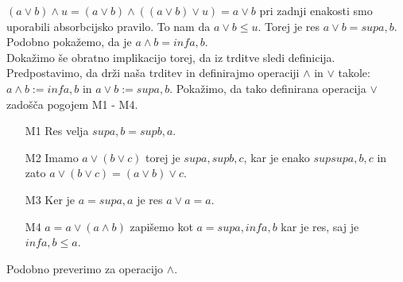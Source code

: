  $ \left(a \vee b\right) \wedge u = \left(a \vee b\right) \wedge \left( \left(a \vee b\right) \vee u\right) = 
 a \vee b$ pri zadnji enakosti smo uporabili absorbcijsko pravilo. To nam da $ a \vee b \leq u$. Torej je res 
 $a \vee b = sup{a, b}$. Podobno pokažemo, da je $a \wedge b = inf{a, b}$.\\
 Dokažimo še obratno implikacijo torej, da iz trditve sledi definicija. Predpostavimo, da drži naša trditev in 
 definirajmo operaciji $\wedge$ in $\vee$ takole: $a \wedge b := inf{a, b}$ in $a \vee b := sup{a, b}$.
 Pokažimo, da tako definirana operacija $\vee$ zadošča pogojem M1 - M4.
 \begin{enumerate}
    \item[M1] Res velja $sup{a, b} = sup{b, a}$.
    \item[M2] Imamo $a \vee \left(b \vee c\right)$ torej je $sup{a, sup{b, c}}$, kar je enako $sup{sup{a,b}, c}$ in zato 
    $a \vee \left(b \vee c\right) = \left(a \vee b\right) \vee c$. 
    \item[M3] Ker je $a = sup{a, a}$ je res $a \vee a = a$. 
    \item[M4] $a = a \vee \left(a \wedge b\right)$ zapišemo kot $a = sup {a, inf{a, b}}$ kar je res, saj je $inf{a, b} 
    \leq a$. 
 \end{enumerate} 
Podobno preverimo za operacijo $\wedge$.